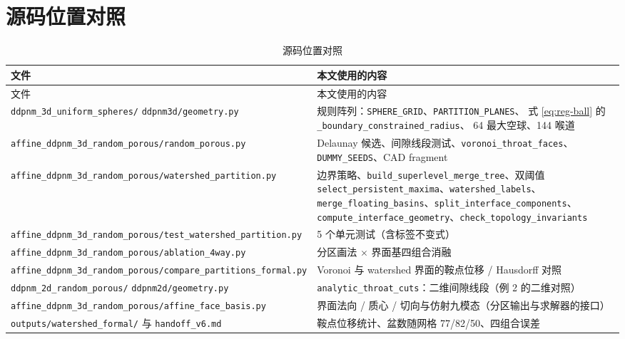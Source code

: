 \documentclass[UTF8,zihao=-4]{ctexart}
\begin{document}
\appendix
\section{源码位置对照}

\begin{longtable}{p{5.2cm}p{8.0cm}}
\caption{源码位置对照}\\
\toprule
文件 & 本文使用的内容\\
\midrule
\endfirsthead
\toprule
文件 & 本文使用的内容\\
\midrule
\endhead
\small
\texttt{ddpnm\_3d\_uniform\_spheres/} \texttt{ddpnm3d/geometry.py}
& 规则阵列：\texttt{SPHERE\_GRID}、\texttt{PARTITION\_PLANES}、
式 \eqref{eq:reg-ball} 的 \texttt{\_boundary\_constrained\_radius}、
64 最大空球、144 喉道\\
\texttt{affine\_ddpnm\_3d\_random\_porous/\allowbreak{}random\_porous.py}
& Delaunay 候选、间隙线段测试、\texttt{voronoi\_throat\_faces}、
\texttt{DUMMY\_SEEDS}、CAD fragment\\
\texttt{affine\_ddpnm\_3d\_random\_porous/\allowbreak{}watershed\_partition.py}
& 边界策略、\texttt{build\_superlevel\_merge\_tree}、双阈值
\texttt{select\_persistent\_maxima}、\texttt{watershed\_labels}、
\texttt{merge\_floating\_basins}、\texttt{split\_interface\_components}、
\texttt{compute\_interface\_geometry}、\texttt{check\_topology\_invariants}\\
\texttt{affine\_ddpnm\_3d\_random\_porous/\allowbreak{}test\_watershed\_partition.py}
& 5 个单元测试（含标签不变式）\\
\texttt{affine\_ddpnm\_3d\_random\_porous/\allowbreak{}ablation\_4way.py}
& 分区画法 $\times$ 界面基四组合消融\\
\texttt{affine\_ddpnm\_3d\_random\_porous/\allowbreak{}compare\_partitions\_formal.py}
& Voronoi 与 watershed 界面的鞍点位移 / Hausdorff 对照\\
\texttt{ddpnm\_2d\_random\_porous/} \texttt{ddpnm2d/geometry.py}
& \texttt{analytic\_throat\_cuts}：二维间隙线段（例 2 的二维对照）\\
\texttt{affine\_ddpnm\_3d\_random\_porous/\allowbreak{}affine\_face\_basis.py}
& 界面法向 / 质心 / 切向与仿射九模态（分区输出与求解器的接口）\\
\texttt{outputs/watershed\_formal/} 与 \texttt{handoff\_v6.md}
& 鞍点位移统计、盆数随网格 77/82/50、四组合误差\\
\bottomrule
\end{longtable}
\end{document}
